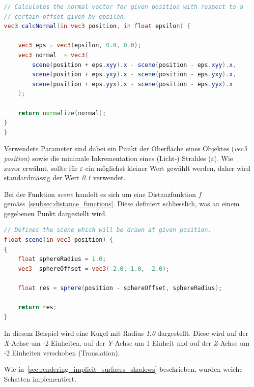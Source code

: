 \begin{lstlisting}[language=GLSL,caption={Berechnung der Normalen einer
        impliziten Oberfläche in
        GLSL.},label={alg:glsl_normal},captionpos=b,emph={calcNormal}]
// Calculates the normal vector for given position with respect to a
// certain offset given by epsilon.
vec3 calcNormal(in vec3 position, in float epsilon) {

    vec3 eps = vec3(epsilon, 0.0, 0.0);
    vec3 normal  = vec3(
        scene(position + eps.xyy).x - scene(position - eps.xyy).x,
        scene(position + eps.yxy).x - scene(position - eps.yxy).x,
        scene(position + eps.yyx).x - scene(position - eps.yyx).x
    );

    return normalize(normal);
}
}
\end{lstlisting}

Verwendete Parameter sind dabei ein Punkt der Oberfläche eines Objektes
(\textit{vec3 position}) sowie die minimale Inkrementation eines
(Licht-) Strahles ($\varepsilon$). Wie zuvor erwähnt, sollte
für $\varepsilon$ ein möglichst kleiner Wert gewählt werden, daher wird
standardmässig der Wert \textit{0.1} verwendet.

Bei der Funktion \textit{scene} handelt es sich um eine Distanzfunktion
$f$ gemäss~\autoref{ssubsec:distance_functions}. Diese definiert
schliesslich, was an einem gegebenen Punkt dargestellt wird.

\begin{lstlisting}[language=GLSL,caption={Distanzfunktion $f$ in
        GLSL.},label={alg:glsl_distance_func},captionpos=b,emph={scene}]
// Defines the scene which will be drawn at given position.
float scene(in vec3 position) {
{
    float sphereRadius = 1.0;
    vec3  sphereOffset = vec3(-2.0, 1.0, -2.0);

    float res = sphere(position - sphereOffset, sphereRadius);

    return res;
}
\end{lstlisting}

In diesem Beispiel wird eine Kugel mit Radius \textit{1.0} dargestellt.
Diese wird auf der \textit{X}-Achse um -2 Einheiten, auf der
\textit{Y}-Achse um 1 Einheit und auf der \textit{Z}-Achse um -2
Einheiten verschoben (Translation).

Wie in~\autoref{sec:rendering_implicit_surfaces_shadows} beschrieben,
wurden weiche Schatten implementiert.

